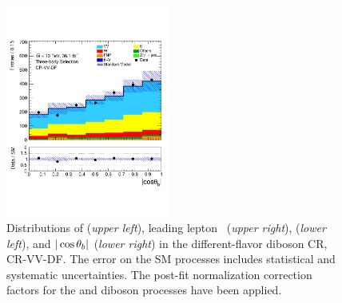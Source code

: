 \begin{figure}[!htb]
\begin{center}
        \includegraphics[width=0.48\textwidth]{figures/search_stop2l/bkg_est/crvdf/crv_cosThetaB}
        \caption{
            Distributions of \mdr (\textit{upper left}), leading lepton \pT~(\textit{upper right}),
            \dpb (\textit{lower left}), and $|\cos\theta_b|$ (\textit{lower right}) in the different-flavor diboson CR,
            CR-VV-DF.
            The error on the SM processes includes statistical and systematic uncertainties.
            The post-fit normalization correction factors for the \ttbar and diboson processes
            have been applied.
        }
        \label{fig:crvvDF_0}
    \end{center}
\end{figure}
